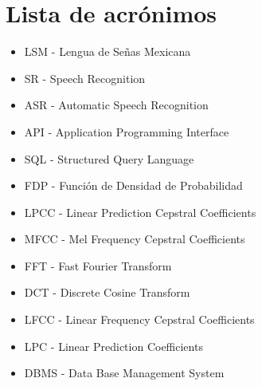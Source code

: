 
\section{Lista de acrónimos}

\begin{itemize}

\item	LSM - Lengua de Señas Mexicana
\item	SR - Speech Recognition
\item	ASR - Automatic Speech Recognition
\item	API - Application Programming Interface
\item	SQL - Structured Query Language
\item	FDP - Función de Densidad de Probabilidad
\item	LPCC - Linear Prediction Cepstral Coefficients
\item	MFCC - Mel Frequency Cepstral Coefficients
\item	FFT - Fast Fourier Transform
\item	DCT - Discrete Cosine Transform
\item	LFCC - Linear Frequency Cepstral Coefficients
\item	LPC - Linear Prediction Coefficients
\item	DBMS - Data Base Management System

\end{itemize}
